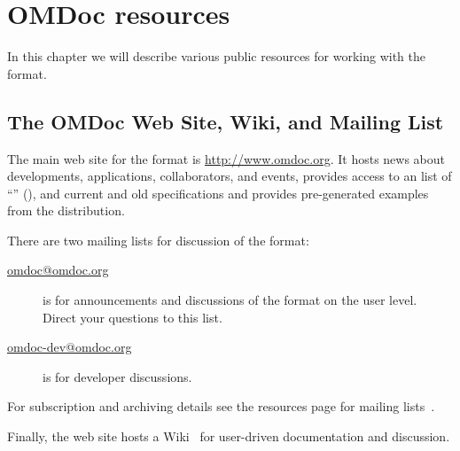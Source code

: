
\chapter{OMDoc resources}\label{chap:resources}
In this chapter we will describe various public resources for working with the
{\omdoc} format.

\section{The OMDoc Web Site, Wiki, and Mailing List}\label{sec:website}  The main web site for the {\omdoc} format is \url{http://www.omdoc.org}.  It
  hosts news about developments, applications, collaborators, and events, provides access
  to an list of ``'' ({}), and
  current and old {\omdoc} specifications and provides pre-generated examples from the
  {\omdoc} distribution.
  
  There are two mailing lists for discussion of the {\omdoc} format: 
  \begin{description}
  \item[\url{omdoc@omdoc.org}] is for announcements and discussions of the {\omdoc}
    format on the user level. Direct your questions to this list.
  \item[\url{omdoc-dev@omdoc.org}] is for developer discussions.
  \end{description}
  For subscription and archiving details see the {\omdoc} resources page for mailing
  lists~\cite{OMDoc-mailinglists:URL}.
  
  Finally, the {\omdoc} web site hosts a Wiki~\cite{OMDoc:wiki} for user-driven
  documentation and discussion.


